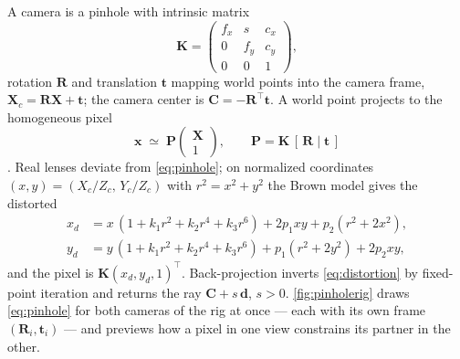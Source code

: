 \documentclass[11pt]{article}
\theoremstyle{definition}
\newcommand{\mat}[1]{\mathbf{#1}}
\newcommand{\vect}[1]{\mathbf{#1}}
\newcommand{\R}{\mat{R}}
\newcommand{\K}{\mat{K}}
\newcommand{\PP}{\mat{P}}
\newcommand{\X}{\vect{X}}
\newcommand{\x}{\vect{x}}
\newcommand{\tv}{\vect{t}}
\newcommand{\Cv}{\vect{C}}
\begin{document}
A camera is a pinhole with intrinsic matrix
\begin{equation}
\K = \begin{pmatrix} f_x & s & c_x \\ 0 & f_y & c_y \\ 0 & 0 & 1 \end{pmatrix},
\label{eq:K}
\end{equation}
rotation $\R$ and translation $\tv$ mapping world points into the camera
frame, $\X_c = \R\X + \tv$; the camera center is $\Cv = -\R^{\!\top}\tv$. A
world point projects to the homogeneous pixel
\begin{equation}
\x \;\simeq\; \PP \begin{pmatrix}\X\\1\end{pmatrix},
\qquad
\PP = \K\,[\,\R \mid \tv\,]
\label{eq:pinhole}
\end{equation}
\cite{HartleyZisserman2004}. Real lenses deviate from \eqref{eq:pinhole}; on
normalized coordinates $(x,y)=(X_c/Z_c,\,Y_c/Z_c)$ with $r^2=x^2{+}y^2$ the
Brown model gives the distorted
\begin{equation}
\begin{aligned}
x_d &= x\,(1 + k_1 r^2 + k_2 r^4 + k_3 r^6) + 2p_1 xy + p_2(r^2 + 2x^2),\\
y_d &= y\,(1 + k_1 r^2 + k_2 r^4 + k_3 r^6) + p_1(r^2 + 2y^2) + 2p_2 xy,
\end{aligned}
\label{eq:distortion}
\end{equation}
and the pixel is $\K(x_d,y_d,1)^{\!\top}$. Back-projection inverts
\eqref{eq:distortion} by fixed-point iteration and returns the ray
$\Cv + s\,\vect d$, $s>0$. \autoref{fig:pinholerig} draws
\eqref{eq:pinhole} for both cameras of the rig at once --- each with its
own frame $(\R_i,\tv_i)$ --- and previews how a pixel in one view
constrains its partner in the other.
\end{document}
